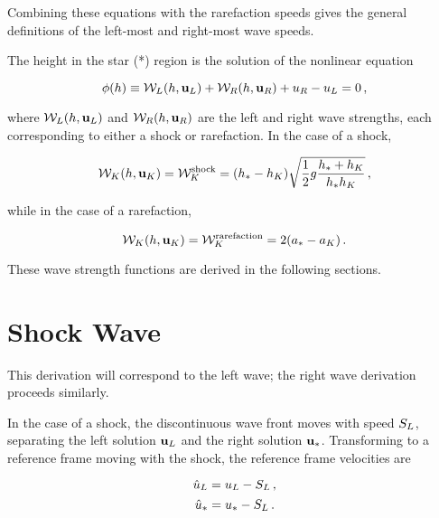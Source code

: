 Combining these equations with the rarefaction speeds gives the general
definitions of the left-most and right-most wave speeds.

The height in the star (*) region is the solution of the nonlinear equation

\begin{equation}
  \phi(h) \equiv
    \mathcal{W}_L(h,\mathbf{u}_L)
    + \mathcal{W}_R(h,\mathbf{u}_R)
    + u_R - u_L
    = 0 \,,
\end{equation}

where $\mathcal{W}_L(h,\mathbf{u}_L)$ and
$\mathcal{W}_R(h,\mathbf{u}_R)$
are the left and right wave strengths, each corresponding to either a shock
or rarefaction. In the case of a shock,

\begin{equation}
  \mathcal{W}_K(h,\mathbf{u}_K) = \mathcal{W}_K^{\text{shock}} = 
    (h_* - h_K)\sqrt{\frac{1}{2}g\frac{h_* + h_K}
    {h_*h_K}}
    \,,
\end{equation}

while in the case of a rarefaction,

\begin{equation}
  \mathcal{W}_K(h,\mathbf{u}_K) = \mathcal{W}_K^{\text{rarefaction}} = 
    2(a_* - a_K)
    \,.
\end{equation}

These wave strength functions are derived in the following sections.

\section{Shock Wave}
This derivation will correspond to the left wave; the right wave derivation
proceeds similarly.

In the case of a shock, the discontinuous wave front moves with speed
$S_L$, separating the left solution $\mathbf{u}_L$ and the right
solution $\mathbf{u}_*$. Transforming to a reference frame moving with the
shock, the reference frame velocities are

\begin{equation}\label{eq:ref_vL}
  \hat{u}_L = u_L - S_L \,,
\end{equation}
\begin{equation}\label{eq:ref_vstar}
  \hat{u}_* = u_* - S_L \,.
\end{equation}


